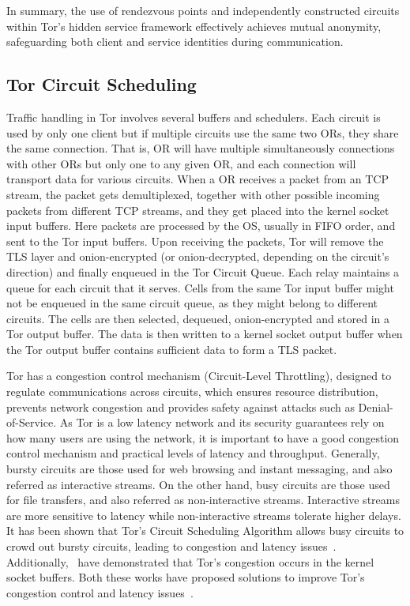 In summary, the use of rendezvous points and independently constructed circuits within Tor's hidden service framework effectively achieves mutual anonymity, safeguarding both client and service identities during communication.

\subsection{Tor Circuit Scheduling}\label{subsec:tor_scheduler}

Traffic handling in Tor involves several buffers and schedulers.
Each circuit is used by only one client but if multiple circuits use the same two ORs, they share the same connection. That is, OR will have multiple simultaneously connections with other ORs but only one to any given OR, and each connection will transport data for various circuits. 
When a OR receives a packet from an TCP stream, the packet gets demultiplexed, together with other possible incoming packets from different TCP streams, and they get placed into the kernel socket input buffers. Here packets are processed by the OS, usually in FIFO order, and sent to the Tor input buffers. Upon receiving the packets, Tor will remove the TLS layer and onion-encrypted (or onion-decrypted, depending on the circuit's direction) and finally enqueued in the Tor Circuit Queue. Each relay maintains a queue for each circuit that it serves. Cells from the same Tor input buffer might not be enqueued in the same circuit queue, as they might belong to different circuits. The cells are then selected, dequeued, onion-encrypted and stored in a Tor output buffer. The data is then written to a kernel socket output buffer when the Tor output buffer contains sufficient data to form a TLS packet.

Tor has a congestion control mechanism (Circuit-Level Throttling), designed to regulate communications across circuits, which ensures resource distribution, prevents network congestion and provides safety against attacks such as Denial-of-Service. As Tor is a low latency network and its security guarantees rely on how many users are using the network, it is important to have a good congestion control mechanism and practical levels of latency and throughput. 
Generally, bursty circuits are those used for web browsing and instant messaging, and also referred as interactive streams. On the other hand, busy circuits are those used for file transfers, and also referred as non-interactive streams. Interactive streams are more sensitive to latency while non-interactive streams tolerate higher delays. It has been shown that Tor's Circuit Scheduling Algorithm allows busy circuits to crowd out bursty circuits, leading to congestion and latency issues~\cite{EWMA}. Additionally,~\citeauthor{KIST} have demonstrated that Tor's congestion occurs in the kernel socket buffers. Both these works have proposed solutions to improve Tor's congestion control and latency issues~\cite{KIST}.

